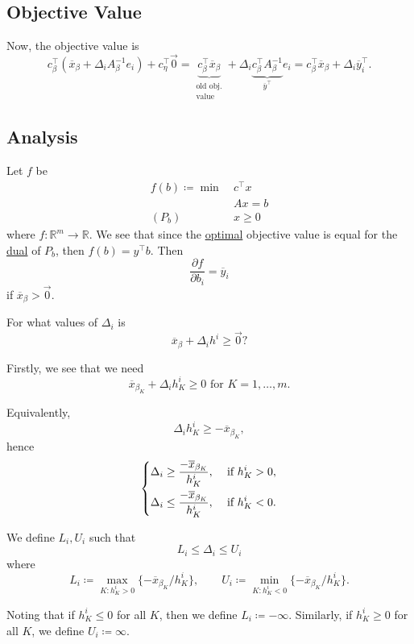 \subsection{Objective Value}
Now, the objective value is
\[
	c_{\beta}^{\top}(\overline{x}_{\beta}+\Delta_{i}A_{\beta}^{-1}e_{i})+ c_{\eta}^{\top}\vec{0}
	= \underbrace{c_{\beta}^{\top}\overline{x}_{\beta}}_{\substack{\text{old obj.}\\\text{value}}}+\Delta_{i}\underbrace{c_{\beta}^{\top}A_{\beta}^{-1}}_{\overline{y}^{\top}}e_{i}
	= c_{\beta}^{\top}\overline{x}_{\beta}+\Delta_{i}\overline{y}^{\top}_i.
\]

\subsection{Analysis}
Let \(f\) be
\[
	\begin{aligned}
		f(b)\coloneqq \min~ & c^{\top}x \\
		                    & Ax = b    \\
		(P_b)\quad          & x\geq 0
	\end{aligned}
\]
where \(f\colon \mathbb{R}^{m}\to \mathbb{R}\). We see that since the \hyperref[def:optimal-solution]{optimal} objective value is equal for the \hyperref[def:dual]{dual} of \(P_b\), then \(f(b) = y^{\top}b\). Then
\[
	\frac{\partial f}{\partial b_{i}} = \overline{y}_i
\]
if \(\overline{x}_{\beta}>\vec{0}\).

\begin{problem*}
	For what values of \(\Delta_{i}\) is
	\[
		\overline{x}_{\beta} + \Delta_{i}h^i \geq \vec{0}?
	\]
\end{problem*}
\begin{answer}
	Firstly, we see that we need
	\[
		\overline{x}_{\beta_K}+\Delta_{i}h^i_K \geq 0 \text{ for }K = 1, \dots , m.
	\]

	Equivalently,
	\[
		\Delta_{i}h^i_K \geq -\overline{x}_{\beta_K},
	\]
	hence
	\[
		\begin{dcases}
			\Delta_{i}\geq \frac{-\overline{x}_{\beta_K}}{h^i_K}, & \text{ if }h^i_K>0, \\
			\Delta_{i}\leq \frac{-\overline{x}_{\beta_K}}{h^i_K}, & \text{ if }h^i_K<0.
		\end{dcases}
	\]

	We define \(L_{i}, U_{i}\) such that
	\[
		L_{i}\leq \Delta_{i}\leq U_{i}
	\]
	where
	\[
		L_{i} \coloneqq \max_{K\colon h^i_K > 0}\{-\overline{x}_{\beta_K}/h^i_K\},\qquad U_{i} \coloneqq \min_{K\colon h^i_K < 0}\{-\overline{x}_{\beta_K}/h^i_K\}.
	\]
\end{answer}
\begin{remark}
	Noting that if \(h^i_K\leq 0\) for all \(K\), then we define \(L_{i} \coloneqq -\infty \). Similarly, if \(h^i_K\geq 0\) for all \(K\), we define \(U_i \coloneqq \infty \).
\end{remark}

